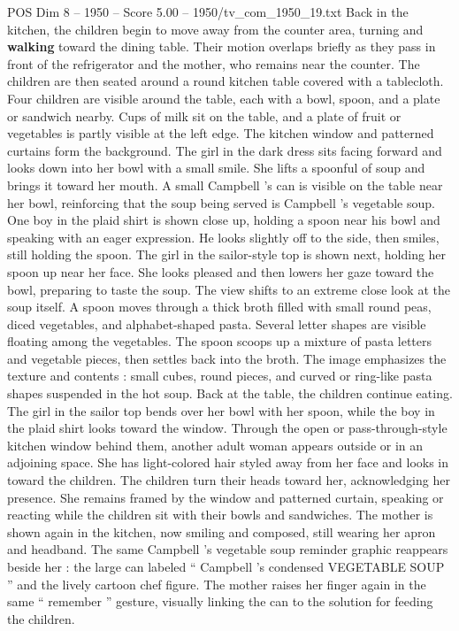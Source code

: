 \begin{textsample}{POS Dim 8 – 1950 – Score 5.00 – 1950/tv\_com\_1950\_19.txt}
Back in the kitchen, the children begin to move away from the counter area, turning and \textbf{walking} toward the dining table.
Their motion overlaps briefly as they pass in front of the refrigerator and the mother, who remains near the counter.
The children are then seated around a round kitchen table covered with a tablecloth.
Four children are visible around the table, each with a bowl, spoon, and a plate or sandwich nearby.
Cups of milk sit on the table, and a plate of fruit or vegetables is partly visible at the left edge.
The kitchen window and patterned curtains form the background.
The girl in the dark dress sits facing forward and looks down into her bowl with a small smile.
She lifts a spoonful of soup and brings it toward her mouth.
A small Campbell ’s can is visible on the table near her bowl, reinforcing that the soup being served is Campbell ’s vegetable soup.
One boy in the plaid shirt is shown close up, holding a spoon near his bowl and speaking with an eager expression.
He looks slightly off to the side, then smiles, still holding the spoon.
The girl in the sailor-style top is shown next, holding her spoon up near her face.
She looks pleased and then lowers her gaze toward the bowl, preparing to taste the soup.
The view shifts to an extreme close look at the soup itself.
A spoon moves through a thick broth filled with small round peas, diced vegetables, and alphabet-shaped pasta.
Several letter shapes are visible floating among the vegetables.
The spoon scoops up a mixture of pasta letters and vegetable pieces, then settles back into the broth.
The image emphasizes the texture and contents : small cubes, round pieces, and curved or ring-like pasta shapes suspended in the hot soup.
Back at the table, the children continue eating.
The girl in the sailor top bends over her bowl with her spoon, while the boy in the plaid shirt looks toward the window.
Through the open or pass-through-style kitchen window behind them, another adult woman appears outside or in an adjoining space.
She has light-colored hair styled away from her face and looks in toward the children.
The children turn their heads toward her, acknowledging her presence.
She remains framed by the window and patterned curtain, speaking or reacting while the children sit with their bowls and sandwiches.
The mother is shown again in the kitchen, now smiling and composed, still wearing her apron and headband.
The same Campbell ’s vegetable soup reminder graphic reappears beside her : the large can labeled “ Campbell ’s condensed VEGETABLE SOUP ” and the lively cartoon chef figure.
The mother raises her finger again in the same “ remember ” gesture, visually linking the can to the solution for feeding the children.

\end{textsample}
